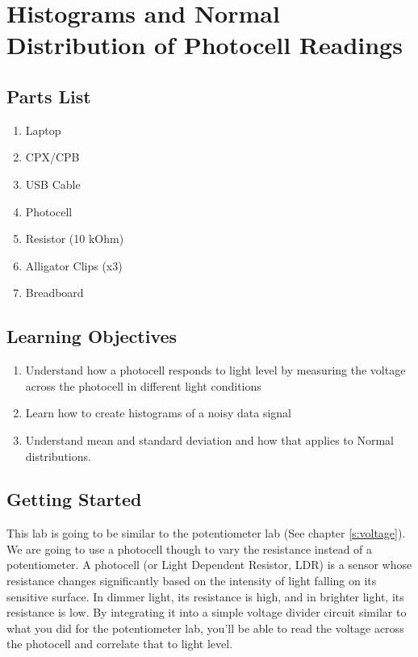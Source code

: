 \newpage

\section{Histograms and Normal Distribution of Photocell Readings}
\label{s:photocell}

\subsection{Parts List}

\begin{enumerate}[itemsep=-5pt]
\item Laptop
\item CPX/CPB
\item USB Cable
\item Photocell
\item Resistor (10 kOhm)
\item Alligator Clips (x3)
\item Breadboard
\end{enumerate}

\subsection{Learning Objectives}
\begin{enumerate}[itemsep=-5pt]
\item Understand how a photocell responds to light level by measuring the voltage across the photocell in different light conditions
\item Learn how to create histograms of a noisy data signal
\item Understand mean and standard deviation and how that applies to Normal distributions.
\end{enumerate}

\subsection{Getting Started}

This lab is going to be similar to the potentiometer lab (See chapter \ref{s:voltage}). We are going to use a photocell though to vary the resistance instead of a potentiometer. A photocell (or Light Dependent Resistor, LDR) is a sensor whose resistance changes significantly based on the intensity of light falling on its sensitive surface. In dimmer light, its resistance is high, and in brighter light, its resistance is low. By integrating it into a simple voltage divider circuit similar to what you did for the potentiometer lab, you'll be able to read the voltage across the photocell and correlate that to light level. 

